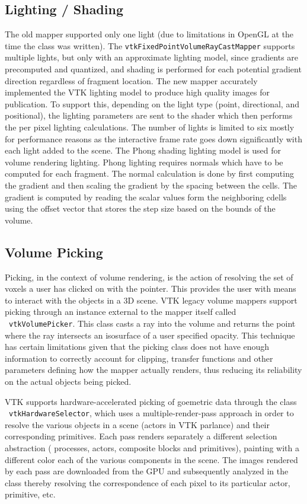 \subsection{Lighting / Shading }
The old mapper supported only one light (due to limitations in OpenGL at the
time the class was written). The \texttt{vtkFixedPointVolumeRayCastMapper}
supports multiple lights, but only with an approximate lighting model, since
gradients are precomputed and quantized, and shading is performed for each
potential gradient direction regardless of fragment location. The new mapper
accurately implemented the VTK lighting model to produce high quality images for
publication. To support this, depending on the light type (point, directional,
and positional), the lighting parameters are sent to the shader which then
performs the per pixel lighting calculations. The number of lights is limited to
six mostly for performance reasons as the interactive frame rate goes down
significantly with each light added to the scene. The Phong shading lighting
model is used for volume rendering lighting. Phong lighting requires normals
which have to be computed for each fragment. The normal calculation is done by
first computing the gradient and then scaling the gradient by the spacing
between the cells. The gradient is computed by reading the scalar values form
the neighboring cdells using the offset vector that stores the step size based
on the bounds of the volume. 

\subsection{Volume Picking} Picking, in the context of volume rendering, is
the action of resolving the set of voxels a user has clicked on with the
pointer. This provides the user with means to interact with the objects in a 3D
scene. VTK legacy volume mappers support picking through an instance external to
the mapper itself called ~\texttt{vtkVolumePicker}.  This class casts a ray into
the volume and returns the point where the ray intersects an isosurface of a
user specified opacity. This technique has certain limitations given that the
picking class does not have enough information to correctly account for
clipping, transfer functions and other parameters defining how the mapper
actually renders, thus reducing its reliability on the actual objects being
picked.

VTK supports hardware-accelerated picking of goemetric data through the class
~\texttt{vtkHardwareSelector}, which uses a multiple-render-pass approach in
order to resolve the various objects in a scene (actors in VTK parlance) and
their corresponding primitives.  Each pass renders separately a different
selection abstraction ( processes, actors, composite blocks and primitives),
painting with a different color each of the various components in the scene.
The images rendered by each pass are downloaded from the GPU and subsequently
analyzed in the class thereby resolving the correspondence of each pixel to its
particular actor, primitive, etc.

